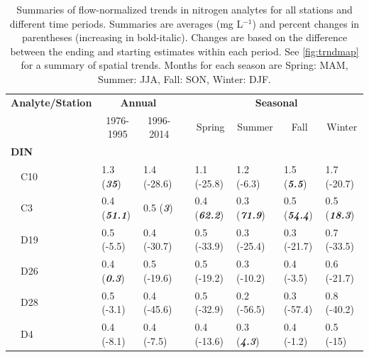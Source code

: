 \documentclass[letterpaper,12pt,oneside]{article}\usepackage[]{graphicx}\usepackage[]{color}
\begin{document}
\begin{table}[!tbp]
\caption{Summaries of flow-normalized trends in nitrogen analytes for all stations and different time periods.  Summaries are averages (mg L$^{-1}$) and percent changes in parentheses (increasing in bold-italic).  Changes are based on the difference between the ending and starting estimates within each period.  See \cref{fig:trndmap} for a summary of spatial trends. Months for each season are Spring: MAM, Summer: JJA, Fall: SON, Winter: DJF.\label{tab:trnds}} 
\begin{center}
\begin{tabular}{lllcllll}
\hline\hline
\multicolumn{1}{l}{\bfseries Analyte/Station}&\multicolumn{2}{c}{\bfseries Annual}&\multicolumn{1}{c}{\bfseries }&\multicolumn{4}{c}{\bfseries Seasonal}\tabularnewline
\cline{2-3} \cline{5-8}
\multicolumn{1}{l}{}&\multicolumn{1}{c}{1976-1995}&\multicolumn{1}{c}{1996-2014}&\multicolumn{1}{c}{}&\multicolumn{1}{c}{Spring}&\multicolumn{1}{c}{Summer}&\multicolumn{1}{c}{Fall}&\multicolumn{1}{c}{Winter}\tabularnewline
\hline
{\bfseries DIN}&&&&&&&\tabularnewline
~~C10&1.3 \footnotesize{(\textit{\textbf{35}})}&1.4 \footnotesize{(-28.6)}&&1.1 \footnotesize{(-25.8)}&1.2 \footnotesize{(-6.3)}&1.5 \footnotesize{(\textit{\textbf{5.5}})}&1.7 \footnotesize{(-20.7)}\tabularnewline
~~C3&0.4 \footnotesize{(\textit{\textbf{51.1}})}&0.5 \footnotesize{(\textit{\textbf{3}})}&&0.4 \footnotesize{(\textit{\textbf{62.2}})}&0.3 \footnotesize{(\textit{\textbf{71.9}})}&0.5 \footnotesize{(\textit{\textbf{54.4}})}&0.5 \footnotesize{(\textit{\textbf{18.3}})}\tabularnewline
~~D19&0.5 \footnotesize{(-5.5)}&0.4 \footnotesize{(-30.7)}&&0.5 \footnotesize{(-33.9)}&0.3 \footnotesize{(-25.4)}&0.3 \footnotesize{(-21.7)}&0.7 \footnotesize{(-33.5)}\tabularnewline
~~D26&0.4 \footnotesize{(\textit{\textbf{0.3}})}&0.5 \footnotesize{(-19.6)}&&0.5 \footnotesize{(-19.2)}&0.3 \footnotesize{(-10.2)}&0.4 \footnotesize{(-3.5)}&0.6 \footnotesize{(-21.7)}\tabularnewline
~~D28&0.5 \footnotesize{(-3.1)}&0.4 \footnotesize{(-45.6)}&&0.5 \footnotesize{(-32.9)}&0.2 \footnotesize{(-56.5)}&0.3 \footnotesize{(-57.4)}&0.8 \footnotesize{(-40.2)}\tabularnewline
~~D4&0.4 \footnotesize{(-8.1)}&0.4 \footnotesize{(-7.5)}&&0.4 \footnotesize{(-13.6)}&0.3 \footnotesize{(\textit{\textbf{4.3}})}&0.4 \footnotesize{(-1.2)}&0.5 \footnotesize{(-15)}\tabularnewline

\end{tabular}
\end{center}
\end{table}
\end{document}
